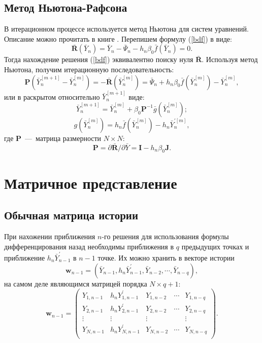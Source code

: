 \documentclass[oneside,final,14pt]{extreport}
\begin{document}
\subsection{Метод Ньютона-Рафсона}
В итерационном процессе используется метод Ньютона для систем уравнений. Описание можно прочитать в книге \cite{andreev}. Перепишем формулу (\ref{bdf}) в виде:
\[
\mathbf{\bar R}(\bar Y_n)= \bar Y_n-\bar\Psi_n-h_n\beta_0\bar f(\bar Y_n)=0.
\]
Тогда нахождение решения (\ref{bdf}) эквивалентно поиску нуля \(\mathbf{\bar R}\). Используя метод Ньютона, получим итерационную последовательность:
\[
\mathbf P(\bar Y_n^{[m+1]}-\bar Y_n^{[m]})=-\mathbf{\bar R}(\bar Y_n^{[m]})=\bar\Psi_n+h_n\beta_0\bar f(\bar Y_n^{[m]})-\bar Y_n^{[m]}
,\]
или в раскрытом относительно \(\bar Y_n^{[m+1]}\) виде:
\begin{equation}
\label{newton}
\bar Y_n^{[m+1]}=\bar Y_n^{[m]}+\beta_0\mathbf P^{-1}\bar g(\bar Y_n^{[m]});
\end{equation}
\[
g(\bar Y_n^{[m]})=h_n\bar f(\bar Y_n^{[m]})-h_n\bar Y_n^{'[m]},
\]
где \(\mathbf P\)~---~матрица размерности \(N\times N\):
\[
\mathbf P=\partial\mathbf{\bar R} / \partial\bar Y=\mathbf I-h_n\beta_0 \mathbf J.
\]


\section{Матричное представление}

\subsection{Обычная матрица истории}
При нахожении приближения \(n\)-го решения для использования формулы дифференцирования назад необходимы приближения в \(q\) предыдущих точках и приближение \(h_n\bar Y_{n-1}^{'}\) в \(n-1\) точке. Их можно хранить в векторе истории
\[\mathbf w_{n-1}=(\bar Y_{n-1} , h_n\bar Y_{n-1}^{'} , \bar Y_{n-2} , \cdots , \bar Y_{n-q})
,\]
на самом деле являющимся матрицей порядка \(N\times q+1\):
\begin{equation}
\label{history}
\mathbf w_{n-1}=
\begin{pmatrix}
	Y_{1,n-1} & h_n Y_{1,n-1}^{'} & Y_{1,n-2} & \cdots &  Y_{1,n-q}\\
	Y_{2,n-1} & h_n Y_{2,n-1}^{'} & Y_{2,n-2} & \cdots &  Y_{2,n-q}\\
	\vdots & \vdots & \vdots &  &  \vdots\\
	Y_{N,n-1} & h_n Y_{N,n-1}^{'} & Y_{N,n-2} & \cdots &  Y_{N,n-q}\\
\end{pmatrix}.
\end{equation}
\end{document}
